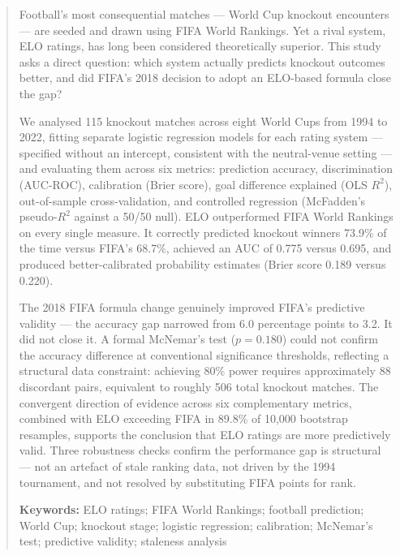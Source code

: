 \documentclass[12pt, a4paper]{article}
\begin{document}
\newpage
\begin{abstract}
\noindent
Football's most consequential matches --- World Cup knockout encounters --- are seeded and
drawn using FIFA World Rankings. Yet a rival system, ELO ratings, has long been considered
theoretically superior. This study asks a direct question: which system actually predicts
knockout outcomes better, and did FIFA's 2018 decision to adopt an ELO-based formula close
the gap?

We analysed 115 knockout matches across eight World Cups from 1994 to 2022, fitting separate
logistic regression models for each rating system --- specified without an intercept, consistent
with the neutral-venue setting --- and evaluating them across six metrics: prediction accuracy,
discrimination (AUC-ROC), calibration (Brier score), goal difference explained (OLS $R^{2}$),
out-of-sample cross-validation, and controlled regression (McFadden's pseudo-$R^{2}$ against a
50/50 null). ELO outperformed FIFA World Rankings on every single measure. It correctly
predicted knockout winners 73.9\% of the time versus FIFA's 68.7\%, achieved an AUC of 0.775
versus 0.695, and produced better-calibrated probability estimates (Brier score 0.189 versus
0.220).

The 2018 FIFA formula change genuinely improved FIFA's predictive validity --- the accuracy gap
narrowed from 6.0 percentage points to 3.2. It did not close it. A formal McNemar's test
($p = 0.180$) could not confirm the accuracy difference at conventional significance thresholds,
reflecting a structural data constraint: achieving 80\% power requires approximately 88
discordant pairs, equivalent to roughly 506 total knockout matches. The convergent direction of
evidence across six complementary metrics, combined with ELO exceeding FIFA in 89.8\% of 10,000
bootstrap resamples, supports the conclusion that ELO ratings are more predictively valid.
Three robustness checks confirm the performance gap is structural --- not an artefact of stale
ranking data, not driven by the 1994 tournament, and not resolved by substituting FIFA points
for rank.

\bigskip
\noindent\textbf{Keywords:} ELO ratings; FIFA World Rankings; football prediction; World Cup;
knockout stage; logistic regression; calibration; McNemar's test; predictive validity;
staleness analysis
\end{abstract}

\newpage
\tableofcontents
\newpage

\end{document}
